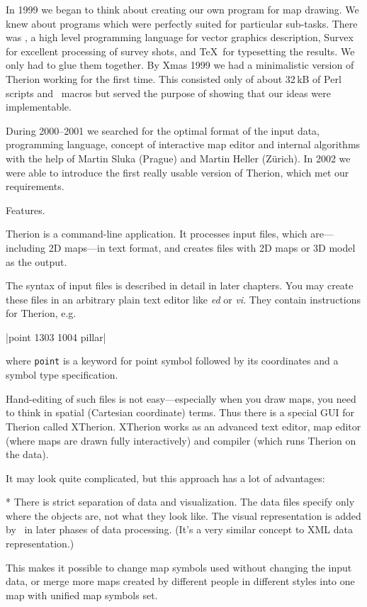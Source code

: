 In 1999 we began to think about creating our own program for map drawing. We knew
about programs which were perfectly suited for particular sub-tasks. There
was \MP, a high level programming language for vector graphics description,
Survex for excellent processing of survey shots, and \TeX\ for typesetting the
results. We only had to glue them together. By Xmas
1999 we had a minimalistic version of Therion working for the first time. This
consisted only of about 32\,kB of Perl scripts and \MP\ macros but served the
purpose of showing that our ideas were implementable.

During 2000--2001 we searched for the optimal format of the input data, programming
language, concept of interactive map editor and internal algorithms with the
help of Martin Sluka (Prague) and Martin Heller (Z\"urich). In 2002 we were able to
introduce the first really usable version of Therion, which met our requirements.


\subchapter Features.

Therion is a command-line application. It processes input files, which
are---including 2D maps---in text format, and creates files with 2D maps or
3D model as the output.

The syntax of input files is described in detail in later chapters.
You may create these files in an arbitrary plain text editor like
{\it ed} or {\it vi}. They contain instructions for Therion, e.g.

|point 1303 1004 pillar|

where {\tt point} is a keyword for point symbol
followed by its coordinates and a symbol type specification.

Hand-editing of such files is not easy---especially when you draw maps, you
need to think in spatial (Cartesian coordinate) terms. Thus there is a special
GUI for Therion called XTherion. XTherion works as an advanced text editor, map
editor (where maps are drawn fully interactively) and compiler (which runs
Therion on the data).

It may look quite complicated, but this approach has a lot of advantages:

\list
* There is strict separation of data and visualization. The data files specify
  only where the objects are, not what they look like. The visual representation
  is added by \MP\ in later phases of data processing. (It's a very
  similar concept to XML data representation.)

  This makes it possible to change map symbols used without changing the
  input data, or merge more maps created by different people in different
  styles into one map with unified map symbols set.

